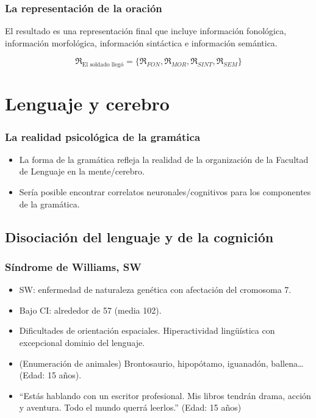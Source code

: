 \documentclass[compress]{beamer}
\begin{document}
	\begin{frame}
	\frametitle{La representación de la oración}

	El resultado es una representación final que incluye información
	fonológica, información morfológica, información sintáctica e
	información semántica.

	\begin{equation*}
	    \mathfrak{R}_{\textrm{El soldado llegó}} = \{\mathfrak{R}_{FON}, \mathfrak{R}_{MOR}, \mathfrak{R}_{SINT}, \mathfrak{R}_{SEM}\}
	\end{equation*}


	\end{frame}




	\section{Lenguaje y cerebro}

	\begin{frame}

	\frametitle{La realidad psicológica de la gramática}

	\begin{itemize}
	\item La forma de la gramática refleja la realidad de la organización de la Facultad de Lenguaje en la mente/cerebro.

	\item Sería posible encontrar correlatos neuronales/cognitivos para los componentes de la gramática.

	\end{itemize}
	\end{frame}


	\subsection{Disociación del lenguaje y de la cognición}
	\begin{frame}
		\frametitle{Síndrome de Williams, SW}
		\begin{itemize}
		\item SW: enfermedad de naturaleza genética con afectación del cromosoma 7.
		\item Bajo CI: alrededor de 57 (media 102).
		\item Dificultades de orientación espaciales. Hiperactividad lingüística con excepcional dominio del lenguaje.
		\item (Enumeración de animales) \alert{Brontosaurio, hipopótamo, iguanadón, ballena}\ldots (Edad: 15 años).
		\item ``Estás hablando con un escritor profesional. Mis libros tendrán drama, acción y aventura. Todo el mundo querrá leerlos.'' (Edad: 15 años)
		\end{itemize}
	\end{frame}
	
\end{document}
